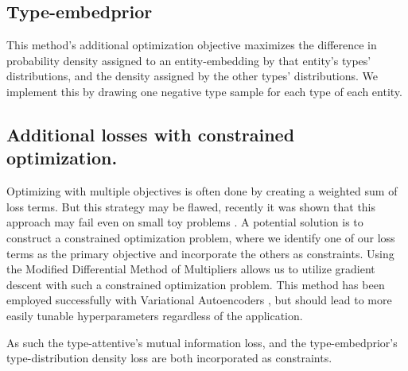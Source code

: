 \subsection{Type-embedprior}\label{sec:experiments:impl_type_embedprior}
This method's additional optimization objective maximizes the difference in probability density assigned to an entity-embedding by that entity's types' distributions, and the density assigned by the other types' distributions.
We implement this by drawing one negative type sample for each type of each entity.


\subsection{Additional losses with constrained optimization.}
Optimizing with multiple objectives is often done by creating a weighted sum of loss terms.
But this strategy may be flawed, recently it was shown that this approach may fail even on small toy problems . %
A potential solution is to construct a constrained optimization problem, where we identify one of our loss terms as the primary objective and incorporate the others as constraints. 
Using the Modified Differential Method of Multipliers  allows us to utilize gradient descent with such a constrained optimization problem.
This method has been employed successfully with Variational Autoencoders , but should lead to more easily tunable hyperparameters regardless of the application.

As such the type-attentive's mutual information loss, and the type-embedprior's type-distribution density loss are both incorporated as constraints.





